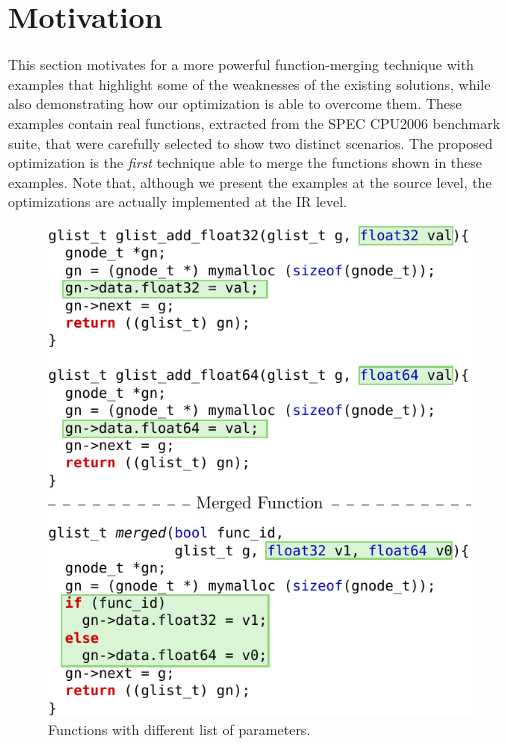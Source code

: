 \section{Motivation} \label{sec:motivation}

This section motivates for a more powerful function-merging technique with
examples that highlight some of the weaknesses of the existing solutions, while
also demonstrating how our optimization is able to overcome them.
These examples contain real functions, extracted from the SPEC CPU2006 benchmark
suite, that were carefully selected to show two distinct scenarios.
The proposed optimization is the \textit{first} technique able to merge the
functions shown in these examples.
Note that, although we present the examples at the source level, the
optimizations are actually implemented at the IR level.

\begin{figure}[th]
  \centering
  \includegraphics[width=.95\linewidth]{figs/sphinx-example.pdf}
  \caption{Functions with different list of parameters.}
  \label{fig:sphinx-example}
\end{figure}

